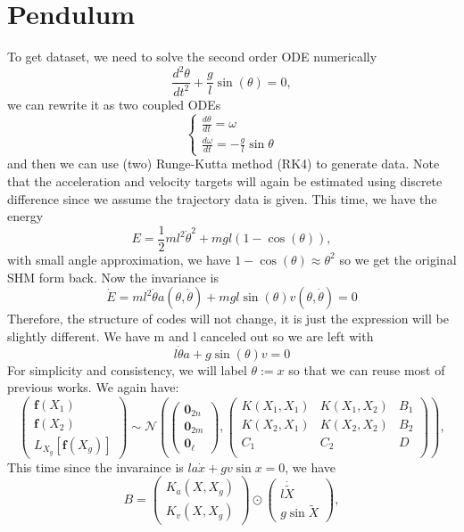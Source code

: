 \documentclass{article}
\begin{document}
\section*{Pendulum}
To get dataset, we need to solve the second order ODE numerically
$$
\frac{d^2\theta}{dt^2}+\frac{g}{l}\sin(\theta)=0,
$$ 
we can rewrite it as two coupled ODEs
$$
\begin{cases}
  \frac{d\theta}{dt} = \omega \\
  \frac{d\omega}{dt} = -\frac{g}{l}\sin\theta
\end{cases}
$$
and then we can use (two) Runge-Kutta method (RK4) to generate data.
Note that the acceleration and velocity targets will again be estimated using discrete difference since we assume the trajectory data is given.
This time, we have the energy 
$$
E = \frac{1}{2}ml^2\dot{\theta}^2 + mgl(1-\cos(\theta)), 
$$
with small angle approximation, we have $1-\cos(\theta)\approx\theta^2$ so we get the original SHM form back.
Now the invariance is $$\dot{E} = ml^2\dot{\theta}a(\theta, \dot{\theta})+mgl\sin(\theta)v(\theta, \dot{\theta})=0$$
Therefore, the structure of codes will not change, it is just the expression will be slightly different.
We have m and l canceled out so we are left with 
$$
l\dot{\theta}a+g\sin(\theta)v=0
$$
For simplicity and consistency, we will label $\theta:=x$ so that we can reuse most of previous works.
We again have:
$$
\begin{pmatrix}
  \mathbf{f}(X_1)\\\mathbf{f}(X_2) \\ L_{X_g}[\mathbf{f}(X_g)]
\end{pmatrix}
\sim \mathcal{N}
\left(
\begin{pmatrix}
  \mathbf{0}_{2n} \\ \mathbf{0}_{2m} \\ \mathbf{0}_{\ell}
\end{pmatrix},
\begin{pmatrix}
K(X_1, X_1) & K(X_1, X_2) & B_1 \\
K(X_2, X_1) & K(X_2, X_2) & B_2 \\
C_1         & C_2         & D \\
\end{pmatrix}
\right), 
$$
This time since the invaraince is $la\dot{x}+gv\sin x=0$, 
we have 
$$
B = \begin{pmatrix}
  K_a(X, X_g) \\ K_v(X, X_g) \end{pmatrix}
  \odot \begin{pmatrix}
    l\dot{\tilde{X}} \\ g\sin\tilde{X}
  \end{pmatrix}, 
$$
\end{document}
